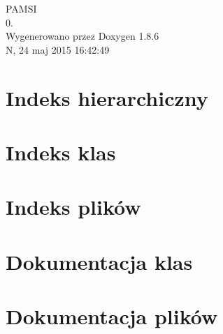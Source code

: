 \documentclass[twoside]{book}
\newcommand{\clearemptydoublepage}{%
  \newpage{\pagestyle{empty}\cleardoublepage}%
}
\begin{document}
\hypersetup{pageanchor=false}
\begin{titlepage}
\vspace*{7cm}
\begin{center}%
{\Large P\-A\-M\-S\-I \\[1ex]\large 0. }\\
\vspace*{1cm}
{\large Wygenerowano przez Doxygen 1.8.6}\\
\vspace*{0.5cm}
{\small N, 24 maj 2015 16:42:49}\\
\end{center}
\end{titlepage}
\clearemptydoublepage
\tableofcontents
\clearemptydoublepage
{}
\hypersetup{pageanchor=true}

\chapter{Indeks hierarchiczny}

\chapter{Indeks klas}

\chapter{Indeks plików}

\chapter{Dokumentacja klas}



















\chapter{Dokumentacja plików}









































\newpage
{}
{}
\printindex
\end{document}
